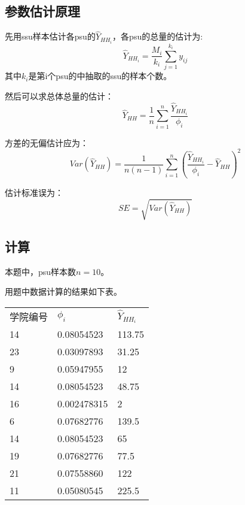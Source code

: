 \documentclass[a4paper,12pt]{article}
\begin{document}
	\subsection{参数估计原理}

	先用ssu样本估计各psu的$\hat{Y}_{HH_i}$，各psu的总量的估计为:
	$$\hat{Y}_{HH_i}=\frac{M_i}{k_i}\sum_{j=1}^{k_i}y_{ij}$$
	其中$k_i$是第i个psu的中抽取的ssu的样本个数。
	
	然后可以求总体总量的估计：$$\hat{Y}_{HH}=\frac{1}{n}\sum_{i=1}^{n}\frac{\hat{Y}_{HH_i}}{\phi_i}$$

	方差的无偏估计应为：
	$$Var(\hat{Y}_{HH})=\frac{1}{n(n-1)}\sum_{i=1}^{n}(\frac{\hat{Y}_{HH_i}}{\phi_i}-\hat{Y}_{HH})^2$$

	估计标准误为：
	$$SE=\sqrt{Var(\hat{Y}_{HH})}$$

	\subsection{计算}

	本题中，psu样本数$n=10$。

	用题中数据计算的结果如下表。

	\newpage

	\begin{table}[]
		\centering
		\begin{tabular}{lll}
		学院编号 & $\phi_i$ & $\hat{Y}_{HH_i}$ \\
		14   &     0.08054523         &          113.75                           \\
		23   &     0.03097893         &          31.25                           \\
		9    &     0.05947955         &          12                           \\
		14   &     0.08054523         &          48.75                           \\
		16   &     0.002478315        &          2                           \\
		6    &     0.07682776         &          139.5                           \\
		14   &     0.08054523         &          65                           \\
		19   &     0.07682776         &          77.5                           \\
		21   &     0.07558860         &          122                           \\
		11   &     0.05080545         &          225.5                          
		\end{tabular}
		\end{table}
\end{document}
